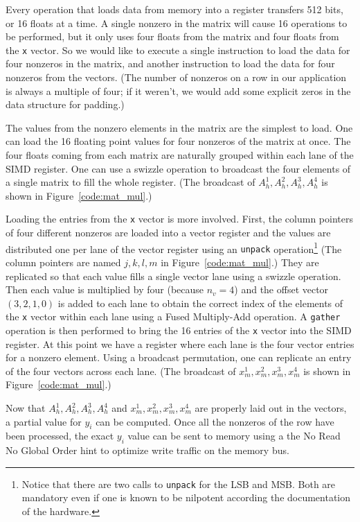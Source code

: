 \documentclass{sig-alternate}
\begin{document}
Every operation that loads data from memory into a register
transfers 512 bits, or 16 floats at a time. A single nonzero
in the matrix will cause 16 operations to be performed, but it only
uses four floats from the matrix and four floats from the {\tt x} vector. So
we would like to execute a single instruction to load the data for four 
nonzeros in the matrix, and another instruction to load the data for
four nonzeros from the vectors.  
(The number of nonzeros on a row in our application is
always a multiple of four; if it weren't, we would add some explicit
zeros in the data structure for padding.)

The values from the nonzero elements in the matrix are the simplest to
load. One can load the 16 floating point values for four nonzeros of
the matrix at once. The four floats coming from each matrix are
naturally grouped within each lane of the SIMD register. One can use a
swizzle operation to broadcast the four elements of a single matrix to
fill the whole register. (The broadcast of $A_h^1,A_h^2,A_h^3,A_h^4$ is
shown in Figure~\ref{code:mat_mul}.)

Loading the entries from the {\tt x} vector is  more
involved. First, the column pointers of four different nonzeros are
loaded into a vector register and the values are distributed one per
lane of the vector register using an {\tt unpack}
operation\footnote{Notice that there are two calls to {\tt unpack} for the
LSB and MSB. Both are mandatory even if one is known to be
nilpotent according the documentation of the hardware.} (The column
pointers are named $j,k,l,m$ in Figure~\ref{code:mat_mul}.) They
are replicated so that each value fills a single vector lane 
using a swizzle operation. Then each value is multiplied by four
(because $n_v=4$) 
and the offset vector $(3,2,1,0)$ is added to each lane to obtain the
correct index of the elements of the {\tt x} vector within each lane
using a Fused Multiply-Add operation. A {\tt gather} operation is then
performed to bring the 16 entries of the {\tt x} vector into the SIMD
register. At this point we have a register where each lane is the
four vector entries for a nonzero element. Using a broadcast
permutation, one can replicate an entry of the four vectors across
each lane. (The broadcast of $x_m^1,x_m^2,x_m^3,x_m^4$ is shown in
Figure~\ref{code:mat_mul}.)

Now that $A_h^1,A_h^2,A_h^3,A_h^4$ and $x_m^1,x_m^2,x_m^3,x_m^4$ are
properly laid out in the vectors, a partial value for $y_i$ can be
computed. Once all the nonzeros of the row have been processed, the
exact $y_i$ value can be sent to memory using a the No Read No Global
Order hint to optimize write traffic on the memory bus.
\end{document}
